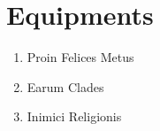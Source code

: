 \section{Equipments}

\begin{enumerate}
    \item Proin Felices Metus
    \item Earum Clades
    \item Inimici Religionis
\end{enumerate}
